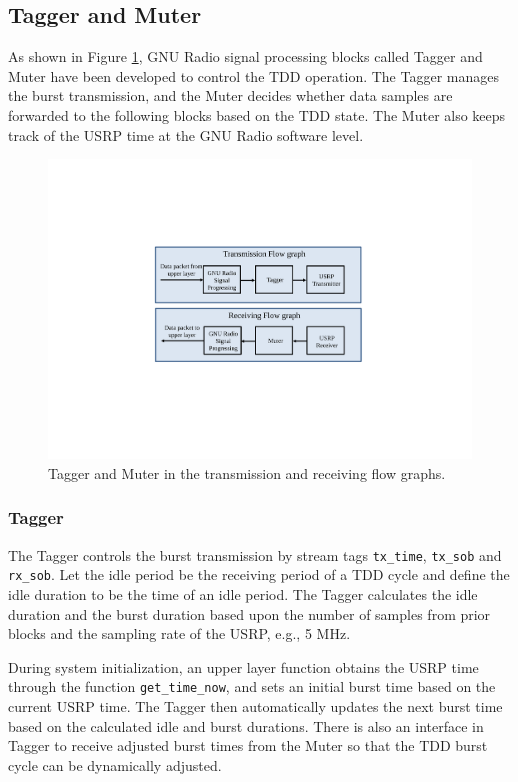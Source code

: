 \subsection{Tagger and Muter}
As shown in Figure \ref{fig:MuterTaggerFlowgraph}, GNU Radio signal processing blocks called Tagger and Muter have been developed to control the TDD operation. The Tagger manages the burst transmission, and the Muter decides whether data samples are forwarded to the following blocks based on the TDD state. The Muter also keeps track of the USRP time at the GNU Radio software level.

\begin{figure}[tpb]
  \begin{center}
    \centerline{\includegraphics[width=140mm]{MuterTaggerFlowgraph.pdf}}
    \caption{Tagger and Muter in the transmission and receiving flow graphs.}
    \label{fig:MuterTaggerFlowgraph}
  \end{center}
\end{figure}

\subsubsection{Tagger}
The Tagger controls the burst transmission by stream tags \texttt{tx\_time}, \texttt{tx\_sob} and \texttt{rx\_sob}. Let the idle period be the receiving period of a TDD cycle and define the idle duration to be the time of an idle period. The Tagger calculates the idle duration and the burst duration based upon the number of samples from prior blocks and the sampling rate of the USRP, e.g., 5 MHz.

During system initialization, an upper layer function obtains the USRP time through the function \texttt{get\_time\_now}, and sets an initial burst time based on the current USRP time. The Tagger then automatically updates the next burst time based on the calculated idle and burst durations. There is also an interface in Tagger to receive adjusted burst times from the Muter so that the TDD burst cycle can be dynamically adjusted.
